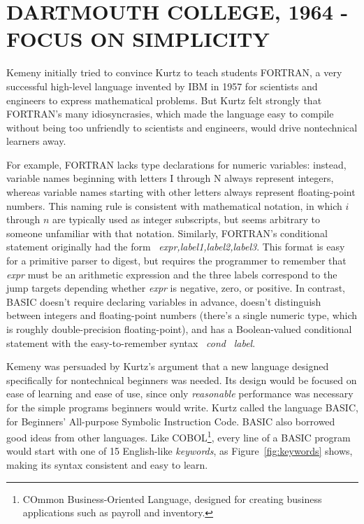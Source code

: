 
\section{DARTMOUTH COLLEGE, 1964 - FOCUS ON SIMPLICITY}


Kemeny initially tried to convince Kurtz to teach students FORTRAN, a
very successful high-level language invented by IBM in 1957 for
scientists and engineers to express mathematical problems.
But Kurtz felt strongly that FORTRAN's many idiosyncrasies, which made
the language easy to compile without being too unfriendly to scientists
and engineers, would drive
nontechnical learners away.

For example, FORTRAN lacks type declarations for numeric
  variables: instead,
  variable names beginning with letters I through N always represent
  integers, whereas variable names starting with other letters always
  represent floating-point numbers.
This naming rule is consistent with mathematical notation, in which
$i$ through $n$ are typically used as integer subscripts, but seems
arbitrary to someone unfamiliar with that notation.
Similarly, FORTRAN's conditional statement originally had the form
~\emph{expr,label1,label2,label3}.  This format is easy 
for a primitive parser to digest,
but requires the programmer to remember that \emph{expr} must
be an arithmetic expression and the three labels 
correspond to the jump targets depending whether
\emph{expr} is negative, zero, or positive.  
In contrast, BASIC  doesn't require declaring variables in advance, 
doesn't distinguish between
integers and floating-point numbers (there's a single numeric type,
which is roughly double-precision floating-point), and
has a Boolean-valued conditional
statement with the easy-to-remember syntax ~\emph{cond}
~\emph{label}.

Kemeny was persuaded by Kurtz's argument that a new language 
designed specifically for nontechnical beginners was needed.
Its design would be focused on ease of learning
and ease of use, since only \emph{reasonable} performance was necessary
for the simple programs beginners would write.
Kurtz called the language BASIC, for Beginners' All-purpose Symbolic
Instruction Code.
BASIC also  borrowed good ideas from other languages.
Like COBOL\footnote{COmmon Business-Oriented Language, designed for creating
business applications such as payroll and inventory.}, every line of a BASIC
program would start with one of 15 English-like \emph{keywords}, as Figure~\ref{fig:keywords} shows,
making its syntax consistent and easy
to learn.

